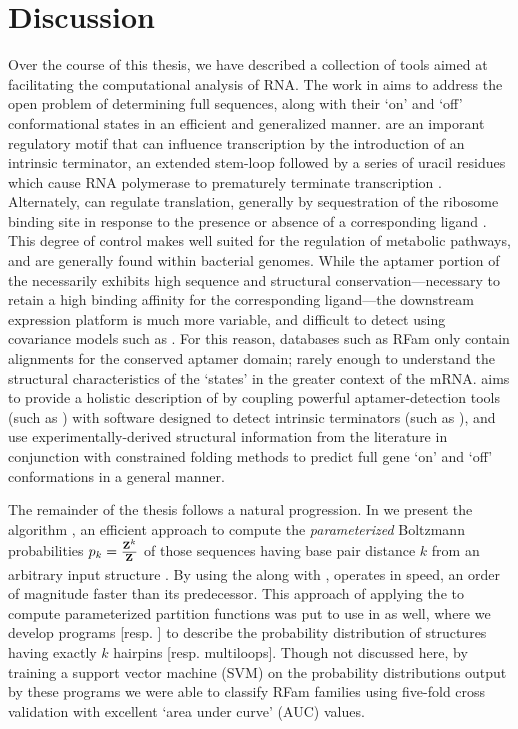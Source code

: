 
\chapter{Discussion}
\label{ch:disc}


Over the course of this thesis, we have described a collection of tools aimed
at facilitating the computational analysis of RNA. The work in 
aims to address the open problem of determining full \rb sequences, along
with their `on' and `off' conformational states in an efficient and generalized
manner. \Rbs are an imporant regulatory motif that can influence
transcription by the introduction of an intrinsic terminator, an extended stem-loop
followed by a series of uracil residues which cause RNA polymerase to prematurely
terminate transcription \citep{gusarov:1999uu,yarnell:1999wt}. Alternately,
\rbs can regulate translation, generally by sequestration of the ribosome
binding site in response to the presence or absence of a corresponding ligand
\citep{barrick:2007gw}. This degree of control makes \rbs well suited for
the regulation of metabolic pathways, and are generally found within bacterial
genomes. While the aptamer portion of the \rb necessarily exhibits high
sequence and structural conservation---necessary to retain a high binding affinity
for the corresponding ligand---the downstream expression platform is much more
variable, and difficult to detect using covariance models such as \infernal
\citep{infernal}. For this reason, databases such as RFam \citep{nawrocki:2014uy}
only contain alignments for the conserved aptamer domain; rarely enough to
understand the structural characteristics of the \rb `states' in the greater
context of the mRNA. \rfinder aims to provide a holistic description of
\rbs by coupling powerful aptamer-detection tools (such as \infernal) with software
designed to detect intrinsic terminators (such as \tthp), and use
experimentally-derived structural information from the literature in conjunction
with constrained folding methods to predict full gene `on' and `off' conformations
in a general manner.

The remainder of the thesis follows a natural progression. In  we
present the algorithm \fftbor, an efficient approach to compute the
{\em parameterized} Boltzmann probabilities $p_k = \frac{{\bf Z}^{k}_{}}{{\bf Z}^{}_{}}$ of
those sequences having base pair distance $k$ from an arbitrary input structure
\strSt. By using the \fft along with \nRoUs, \fftbor operates in  speed,
an order of magnitude faster than its predecessor. This approach of applying the
\fft to compute parameterized partition functions was put to use in
\citep{ding:2014ex} as well, where we develop programs 
[resp. ] to describe the probability distribution of structures
having exactly $k$ hairpins [resp. multiloops]. Though not discussed here, by
training a support vector machine (SVM) on the probability distributions output
by these
programs we were able to classify RFam families using five-fold cross validation
with excellent `area under curve' (AUC) values.

